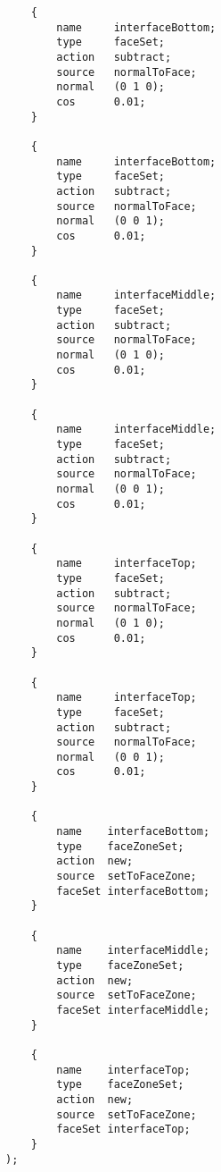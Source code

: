 \begin{lstlisting}
	{
		name     interfaceBottom;
		type     faceSet;
		action   subtract;
		source   normalToFace;
		normal   (0 1 0);
		cos      0.01;
	}
	
	{
		name     interfaceBottom;
		type     faceSet;
		action   subtract;
		source   normalToFace;
		normal   (0 0 1);
		cos      0.01;
	}
	
	{
		name     interfaceMiddle;
		type     faceSet;
		action   subtract;
		source   normalToFace;
		normal   (0 1 0);
		cos      0.01;
	}
	
	{
		name     interfaceMiddle;
		type     faceSet;
		action   subtract;
		source   normalToFace;
		normal   (0 0 1);
		cos      0.01;
	}
	
	{
		name     interfaceTop;
		type     faceSet;
		action   subtract;
		source   normalToFace;
		normal   (0 1 0);
		cos      0.01;
	}
	
	{
		name     interfaceTop;
		type     faceSet;
		action   subtract;
		source   normalToFace;
		normal   (0 0 1);
		cos      0.01;
	}
	
	{
		name	interfaceBottom;
		type	faceZoneSet;
		action 	new;
		source	setToFaceZone;
		faceSet	interfaceBottom;
	}
	
	{
		name	interfaceMiddle;
		type	faceZoneSet;
		action 	new;
		source	setToFaceZone;
		faceSet	interfaceMiddle;
	}
	
	{
		name	interfaceTop;
		type	faceZoneSet;
		action 	new;
		source	setToFaceZone;
		faceSet	interfaceTop;
	}
);

\end{lstlisting}

